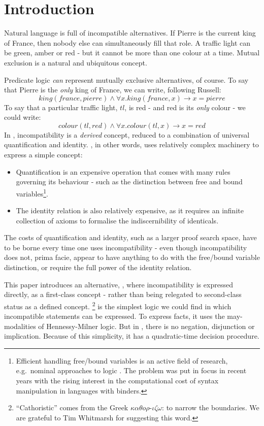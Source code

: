 \section{Introduction}\label{introduction}

Natural language is full of incompatible alternatives.
If Pierre is the current king of France, then nobody else can simultaneously fill that role.
A traffic light can be green, amber or red - but it cannot be more than one colour at a time.
Mutual exclusion is a natural and ubiquitous concept.

Predicate logic \emph{can} represent mutually exclusive alternatives, of course.
To say that Pierre is the \emph{only} king of France, we can write, following Russell:
\[
king(france, pierre) \land \forall x . king(france, x) \rightarrow x = pierre
\]
To say that a particular traffic light, $tl$, is red - and red is its \emph{only} colour - we could write:
\[
colour(tl, red) \land \forall x . colour(tl, x) \rightarrow x = red
\]
In \fol{}, incompatibility is a \emph{derived} concept, reduced to 
a combination of universal quantification and identity.  \FOL{}, in other words, uses relatively complex machinery to express a
simple concept:
\begin{itemize}

\item Quantification is an expensive operation that comes with many
  rules governing its behaviour - such as the distinction between free
  and bound variables\footnote{Efficient handling free/bound variables
    is an active field of research, e.g.~nominal approaches to logic
    \cite{PittsAM:nomsetnasics}. The problem was put in focus in
    recent years with the rising interest in the computational cost of
    syntax manipulation in languages with binders.}.

\item The identity relation is also relatively expensive, as it
  requires an infinite collection of axioms to formalise the
  indiscernibility of identicals.

\end{itemize}

\NI The costs of quantification and identity, such as a larger proof
search space, have to be borne every time one uses incompatibility - even
though incompatibility does not, prima facie, appear to have anything to do
with the free/bound variable distinction, or require the full power of 
the identity relation.

This paper introduces an alternative, \cathoristic{}, where
incompatibility is expressed directly, as a first-class concept -
rather than being relegated to second-class status as a defined
concept. \Cathoristic{}\footnote{``Cathoristic'' comes from the Greek
  $\kappa \alpha \theta o \rho$-$\iota \zeta \omega$: to narrow the
  boundaries. We are grateful to Tim Whitmarsh for suggesting this
  word.} is the simplest logic we could find in which incompatible
statements can be expressed.  To express facts, it uses
the may-modalities of Hennessy-Milner logic.  But in
\cathoristic{}, there is no negation, disjunction or
implication. Because of this simplicity, it has a quadratic-time
decision procedure.

